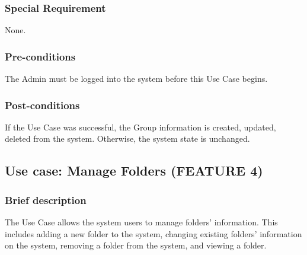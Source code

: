 \subsubsection{Special Requirement}
None.
\subsubsection{Pre-conditions}
The Admin must be logged into the system before this Use Case begins.
\subsubsection{Post-conditions}
If the Use Case was successful, the Group information is created, updated, deleted from the system. Otherwise, the system state is unchanged.

\subsection{Use case: Manage Folders (FEATURE 4)}
\subsubsection{Brief description}
The Use Case allows the system users to manage folders' information. This includes adding a new folder to the system, changing existing folders' information on the system, removing a folder from the system, and viewing a folder.
